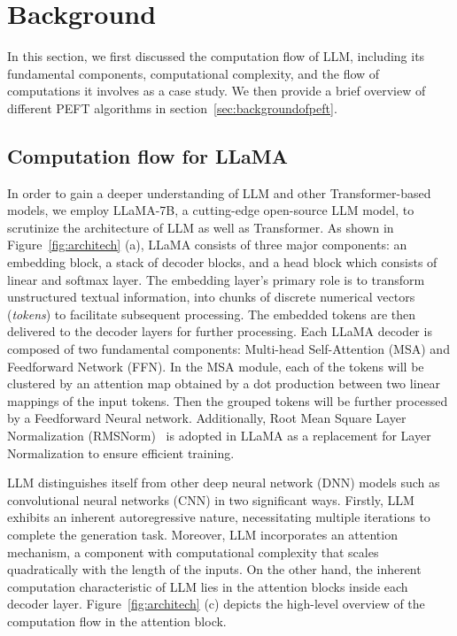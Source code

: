 \section{Background}
\label{sec:background}
In this section, we first discussed the computation flow of LLM, including its fundamental components, computational complexity, and the flow of computations it involves as a case study. We then provide a brief overview of different PEFT algorithms in section~\ref{sec:backgroundofpeft}.
\subsection{Computation flow for LLaMA}
\label{sec:computation flow}
In order to gain a deeper understanding of LLM and other Transformer-based models, we employ LLaMA-7B, a cutting-edge open-source LLM model, to scrutinize the architecture of LLM as well as Transformer. As shown in Figure~\ref{fig:architech} (a), LLaMA consists of three major components: an embedding block, a stack of decoder blocks, and a head block which consists of linear and softmax layer. 
The embedding layer's primary role is to transform unstructured textual information, into chunks of discrete numerical vectors (\textit{tokens}) to facilitate subsequent processing. The embedded tokens are then delivered to the decoder layers for further processing. Each LLaMA decoder is composed of two fundamental components: Multi-head Self-Attention (MSA) and Feedforward Network (FFN). In the MSA module, each of the tokens will be clustered by an attention map obtained by a dot production between two linear mappings of the input tokens. Then the grouped tokens will be further processed by a Feedforward Neural network. Additionally, Root Mean Square Layer Normalization (RMSNorm)~\cite{zhang2019root} is adopted in LLaMA as a replacement for Layer Normalization to ensure efficient training.

LLM distinguishes itself from other deep neural network (DNN) models such as convolutional neural networks (CNN) in two significant ways. Firstly, LLM exhibits an inherent autoregressive nature, necessitating multiple iterations to complete the generation task. 
Moreover, LLM incorporates an attention mechanism, a component with computational complexity that scales quadratically with the length of the inputs. On the other hand, the inherent computation characteristic of LLM lies in the attention blocks inside each decoder layer. Figure~\ref{fig:architech} (c) depicts the high-level overview of the computation flow in the attention block. 

